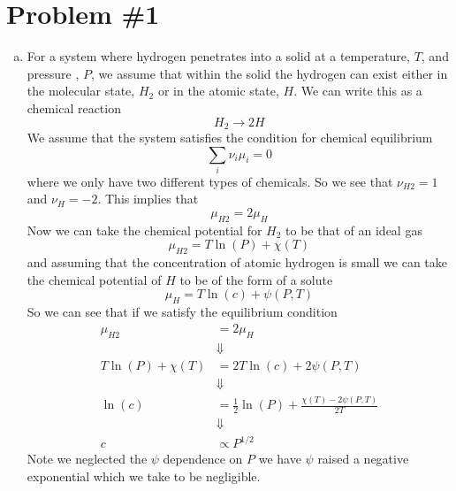 \documentclass[11pt]{article}
\numberwithin{equation}{section}
\begin{document}


\section{Problem \#1}
\begin{enumerate}[(a)]
\item For a system where hydrogen penetrates into a solid at a temperature, $T$, and pressure
, $P$, we assume that within the solid the hydrogen can exist either in the molecular state,
$H_2$ or in the atomic state, $H$. We can write this as a chemical reaction
$$H_2 \rightarrow 2H$$
We assume that the system satisfies the condition for chemical equilibrium 
$$\sum_{i}\nu_i\mu_i = 0$$
where we only have two different types of chemicals. So we see that $\nu_{H2} = 1$ and 
$\nu_{H} = -2$. This implies that
$$\mu_{H2} = 2\mu_{H}$$
Now we can take the chemical potential for $H_2$ to be that of an ideal gas
$$\mu_{H2} = T\ln(P) + \chi(T)$$
and assuming that the concentration of atomic hydrogen is small we can take the chemical 
potential of $H$ to be of the form of a solute
$$\mu_{H} = T\ln(c) + \psi(P,T)$$
So we can see that if we satisfy the equilibrium condition
\begin{align*}
\mu_{H2} &= 2\mu_{H}\\
&\Downarrow\\
T\ln(P) + \chi(T) &= 2T\ln(c) + 2\psi(P,T)\\
&\Downarrow\\
\ln(c) &= \frac{1}{2}\ln(P) + \frac{\chi(T) - 2\psi(P,T)}{2T}\\
&\Downarrow\\
c &\propto P^{1/2}
\end{align*}
Note we neglected the $\psi$ dependence on $P$ we have $\psi$ raised a negative exponential 
which we take to be negligible.


\end{enumerate}
\end{document}
